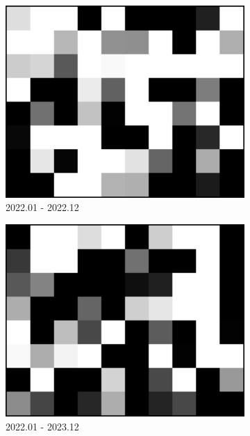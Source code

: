 \documentclass[a4paper,fleqn]{cas-sc}
\begin{document}
\begin{figure}
\begin{subfigure}{0.3\textwidth}
        \centering
        \includegraphics[width=\textwidth]{figure/The azimuth shift/shift_TaklimakanDesert_asc_20221221.png}
        \caption{2022.01 - 2022.12}
        \label{fig_7h}
    \end{subfigure}
    \begin{subfigure}{0.3\textwidth}
        \centering
        \includegraphics[width=\textwidth]{figure/The azimuth shift/shift_TaklimakanDesert_asc_20231228.png}
        \caption{2022.01 - 2023.12}
        \label{fig_7ci}
    \end{subfigure}
    \hfill
    \begin{subfigure}{0.3\textwidth}

\end{subfigure}
\end{figure}
\end{document}
